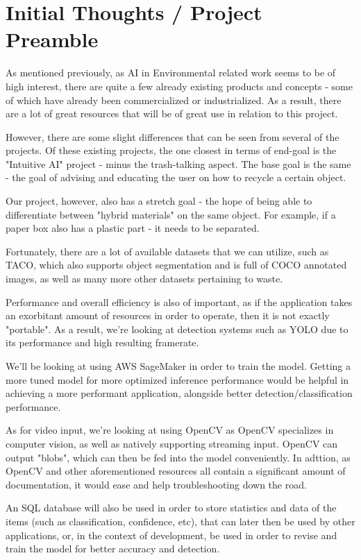\documentclass[conference]{IEEEtran}
\begin{document}
\newpage

\section{Initial Thoughts / Project Preamble}
As mentioned previously, as AI in Environmental related work seems to be of high interest, there are quite a few already existing products and concepts - some of which have already been commercialized or industrialized. As a result, there are a lot of great resources that will be of great use in relation to this project. 

However, there are some slight differences that can be seen from several of the projects. Of these existing projects, the one closest in terms of end-goal is the "Intuitive AI" project - minus the trash-talking aspect. The base goal is the same - the goal of advising and educating the user on how to recycle a certain object.

Our project, however, also has a stretch goal - the hope of being able to differentiate between "hybrid materials" on the same object. For example, if a paper box also has a plastic part - it needs to be separated.

Fortunately, there are a lot of available datasets that we can utilize, such as TACO, which also supports object segmentation and is full of COCO annotated images, as well as many more other datasets pertaining to waste.

Performance and overall efficiency is also of important, as if the application takes an exorbitant amount of resources in order to operate, then it is not exactly "portable". As a result, we're looking at detection systems such as YOLO due to its performance and high resulting framerate.

We'll be looking at using AWS SageMaker in order to train the model. Getting a more tuned model for more optimized inference performance would be helpful in achieving a more performant application, alongside better detection/classification performance.

As for video input, we're looking at using OpenCV as OpenCV specializes in computer vision, as well as natively supporting streaming input. OpenCV can output "blobs", which can then be fed into the model conveniently. In adttion, as OpenCV and other aforementioned  resources all contain a significant amount of documentation, it would ease and help troubleshooting down the road.

An SQL database will also be used in order to store statistics and data of the items (such as classification, confidence, etc), that can later then be used by other applications, or, in the context of development, be used in order to revise and train the model for better accuracy and detection.
\end{document}
